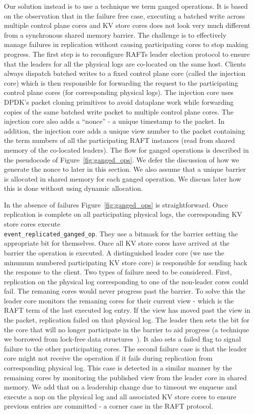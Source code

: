 \documentclass[pageno]{jpaper}
\begin{document}
Our solution instead is to use a technique we term ganged operations. It is
based on the observation that in the failure free case, executing a batched
write across multiple control plane cores and KV store cores does not look very
much different from a synchronous shared memory barrier. The challenge is to
effectively manage failures in replication without causing participating cores
to stop making progress. The first step is to reconfigure RAFTs leader election
protocol to ensure that the leaders for all the physical logs are co-located on
the same host. Clients always dispatch batched writes to a fixed control plane
core (called the injection core) which is then responsible for forwarding the
request to the participating control plane cores (for corresponding physical
logs). The injection core uses DPDK's packet cloning primitives to avoid
dataplane work while forwarding copies of the same batched write packet to
multiple control plane cores. The injection core also adds a ``nonce'' - a
unique timestamp to the packet. In addition, the injection core adds a unique
view number to the packet containing the term numbers of all the participating
RAFT instances (read from shared memory of the co-located leaders).  The flow
for ganged operations is described in the pseudocode of
Figure~\ref{fig:ganged_ops}. We defer the discussion of how we generate the
nonce to later in this section. We also assume that a unique barrier is
allocated in shared memory for each ganged operation. We discuss later how this
is done without using dynamic allocation.

In the absence of failures Figure~\ref{fig:ganged_ops} is straightforward. Once
replication is complete on all participating physical logs, the corresponding KV
store cores execute \\{\tt event\_replicated\_ganged\_op}. They use a bitmask
for the barrier setting the appropriate bit for themselves. Once all KV store
cores have arrived at the barrier the operation is executed. A distinguished
leader core (we use the minumum numbered participating KV store core) is
responsible for sending back the response to the client. Two types of failure
need to be considered. First, replication on the physical log corresponding to
one of the non-leader cores could fail. The remaning cores would never progress
past the barrier. To solve this the leader core monitors the remaning cores for
their current view - which is the RAFT term of the last executed log entry. If
the view has moved past the view in the packet, replication failed on that
physical log. The leader then sets the bit for the core that will no longer
participate in the barrier to aid progress (a technique we borrowed from
lock-free data structures~\cite{lock-free}). It also sets a failed flag to
signal failure to the other participating cores. The second failure case is that
the leader core might not receive the operation if it fails during replication
from corresponding physical log. This case is detected in a similar manner by
the remaining cores by monitoring the published view from the leader core in
shared memory. We add that on a leadership change due to timeout we enqueue and
execute a nop on the physical log and all associated KV store cores to ensure
previous entries are committed - a corner case in the RAFT protocol.
\end{document}
